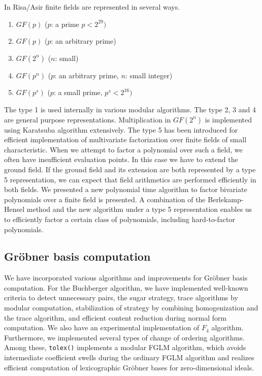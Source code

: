 \documentclass[12pt]{article}
\begin{document}
In Risa/Asir finite fields are represented in several ways.
\begin{enumerate}
\item $GF(p)$ ($p$: a prime $p < 2^{29})$
\item $GF(p)$ ($p$: an arbitrary prime)
\item $GF(2^n)$ ($n$: small)
\item $GF(p^n)$ ($p$: an arbitrary prime, $n$: small integer)
\item $GF(p^s)$ ($p$: a small prime, $p^s < 2^{16})$
\end{enumerate}
The type 1 is used internally in various modular algorithms.  The type
2, 3 and 4 are general purpose representations.  Multiplication in
$GF(2^n)$ is implemented using Karatsuba algorithm extensively.  The
type 5 has been introduced for efficient implementation of
multivariate factorization over finite fields of small characteristic.
When we attempt to factor a polynomial over such a field, we often
have insufficient evaluation points.  In this case we have to extend
the ground field.  If the ground field and its extension are both
represented by a type 5 representation, we can expect that field
arithmetics are performed efficiently in both fields.  We presented a
new polynomial time algorithm to factor bivariate polynomials over a
finite field is presented. A combination of the Berlekamp-Hensel
method and the new algorithm under a type 5 representation enables us
to efficiently factor a certain class of polynomials, including
hard-to-factor polynomials.

\subsection{Gr\"obner basis computation}

We have incorporated various algorithms and improvements for Gr\"obner
basis computation. For the Buchberger algorithm, we have implemented
well-known criteria to detect unnecessary pairs, the sugar strategy,
trace algorithms by modular computation, stabilization of strategy by
combining homogenization and the trace algorithm, and efficient
content reduction during normal form computation.  We also have an
experimental implementation of $F_4$ algorithm.  Furthermore, we
implemented several types of change of ordering algorithms.  Among
these, {\tt tolex()} implements a modular FGLM algorithm, which avoids
intermediate coefficient swells during the ordinary FGLM algorithm and
realizes efficient computation of lexicographic Gr\"obner bases for
zero-dimensional ideals.
\end{document}
